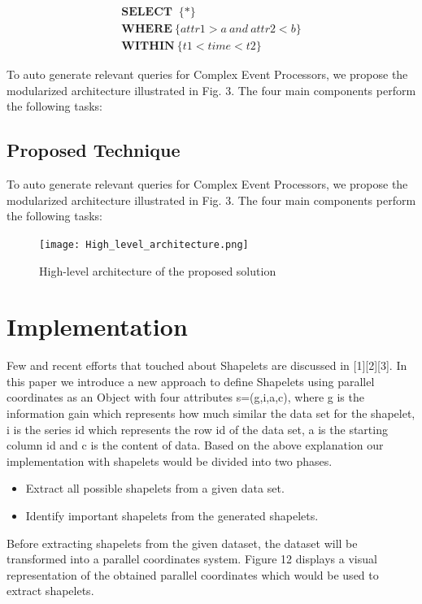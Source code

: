 \documentclass[letterpaper, 10 pt, conference]{IEEEtran}  %
\begin{document}
\begin{equation}
\begin{split}
\textbf{SELECT }\ \{*\} \\ \textbf{WHERE}\ \{attr1>a\ and \ attr2<b\} \\ \textbf{WITHIN}\ \{t1<time<t2\}
\end{split}
\end{equation}

To auto generate relevant queries for Complex Event Processors, we propose the modularized architecture illustrated in Fig. 3. The four main components perform the following tasks:


\subsection{Proposed Technique}
To auto generate relevant queries for Complex Event Processors, we propose the modularized architecture illustrated in Fig. 3. The four main components perform the following tasks:

\begin{figure}[h!]
\texttt{[image: High\_level\_architecture.png]}
\caption{High-level architecture of the proposed solution}
\end{figure}


\section{Implementation}
Few and recent efforts that touched about Shapelets are discussed in [1][2][3]. In this paper we introduce a new approach to define Shapelets using parallel coordinates as an Object with four attributes s=(g,i,a,c), where g is the information gain which represents how much similar the data set for the shapelet, i is the series id which represents the row id of the data set, a is the starting column id and c is the content of data. Based on the above explanation our implementation with shapelets would be divided into two phases.

\begin{itemize}
\item Extract all possible shapelets from a given data set.
\item Identify important shapelets from the generated shapelets.
\end{itemize}

Before extracting shapelets from the given dataset, the dataset will be transformed into a parallel coordinates system. Figure 12 displays a visual representation of the obtained parallel coordinates which would be used to extract shapelets.
\end{document}
